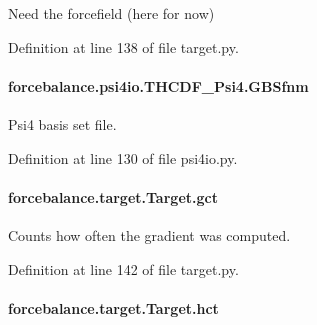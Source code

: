 Need the forcefield (here for now) 



Definition at line 138 of file target.\-py.

\hypertarget{classforcebalance_1_1psi4io_1_1THCDF__Psi4_ab406b703826e225ec1e1bb174faf0537}{
\paragraph[{G\-B\-Sfnm}]{\setlength{\rightskip}{0pt plus 5cm}forcebalance.\-psi4io.\-T\-H\-C\-D\-F\-\_\-\-Psi4.\-G\-B\-Sfnm}}\label{classforcebalance_1_1psi4io_1_1THCDF__Psi4_ab406b703826e225ec1e1bb174faf0537}


Psi4 basis set file. 



Definition at line 130 of file psi4io.\-py.

\hypertarget{classforcebalance_1_1target_1_1Target_aa625ac88c6744eb14ef281d9496d0dbb}{
\paragraph[{gct}]{\setlength{\rightskip}{0pt plus 5cm}forcebalance.\-target.\-Target.\-gct\hspace{0.3cm}{\ttfamily [inherited]}}}\label{classforcebalance_1_1target_1_1Target_aa625ac88c6744eb14ef281d9496d0dbb}


Counts how often the gradient was computed. 



Definition at line 142 of file target.\-py.

\hypertarget{classforcebalance_1_1target_1_1Target_a5b5a42f78052b47f29ed4b940c6111a1}{
\paragraph[{hct}]{\setlength{\rightskip}{0pt plus 5cm}forcebalance.\-target.\-Target.\-hct\hspace{0.3cm}{\ttfamily [inherited]}}}\label{classforcebalance_1_1target_1_1Target_a5b5a42f78052b47f29ed4b940c6111a1}


